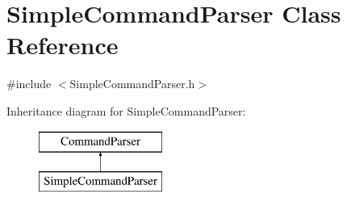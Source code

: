 \hypertarget{class_simple_command_parser}{}\section{Simple\+Command\+Parser Class Reference}
\label{class_simple_command_parser}


{\ttfamily \#include $<$Simple\+Command\+Parser.\+h$>$}

Inheritance diagram for Simple\+Command\+Parser\+:\begin{figure}[H]
\begin{center}
\leavevmode
\includegraphics[height=2.000000cm]{class_simple_command_parser}
\end{center}
\end{figure}
